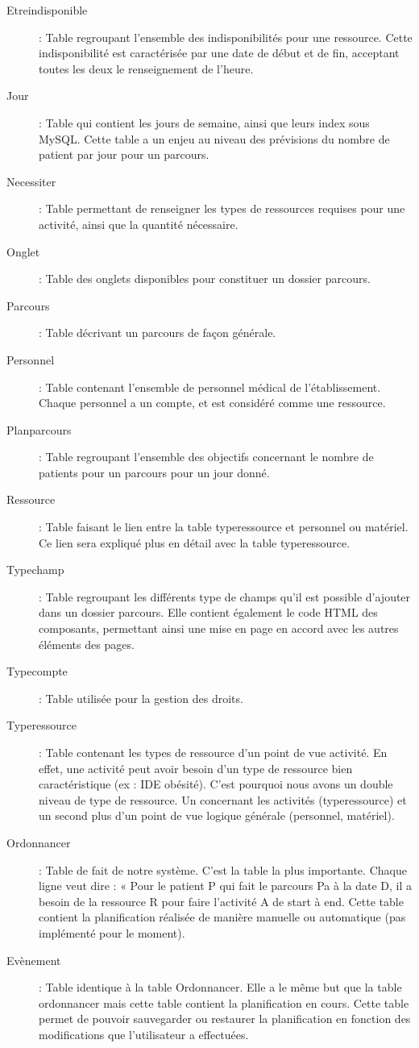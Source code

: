 \documentclass{polytech/polytech}
\begin{document}
\begin{description}
	\item[Etreindisponible] : Table regroupant l'ensemble des indisponibilités pour une ressource. Cette indisponibilité est caractérisée par une date de début et de fin, acceptant toutes les deux le renseignement de l'heure.
	\item[Jour] : Table qui contient les jours de semaine, ainsi que leurs index sous MySQL. Cette table a un enjeu au niveau des prévisions du nombre de patient par jour pour un parcours.
	\item[Necessiter] : Table permettant de renseigner les types de ressources requises pour une activité, ainsi que la quantité nécessaire.
	\item[Onglet] : Table des onglets disponibles pour constituer un dossier parcours.
	\item[Parcours]	 : Table décrivant un parcours de façon générale.
	\item[Personnel] : Table contenant l'ensemble de personnel médical de l'établissement. Chaque personnel a un compte, et est considéré comme une ressource.
	\item[Planparcours] : Table regroupant l'ensemble des objectifs concernant le nombre de patients pour un parcours pour un jour donné.
	\item[Ressource] : Table faisant le lien entre la table typeressource et personnel ou matériel. Ce lien	sera expliqué plus en détail avec la table typeressource.
	\item[Typechamp] : Table regroupant les différents type de champs qu'il est possible d'ajouter dans un dossier parcours. Elle contient également le code HTML des composants, permettant ainsi une	mise en page en accord avec les autres éléments des pages.
	\item[Typecompte] : Table utilisée pour la gestion des droits.
	\item[Typeressource] : Table contenant les types de ressource d'un point de vue activité. En effet, une activité peut avoir besoin d'un type de ressource bien caractéristique (ex : IDE obésité). C'est pourquoi nous avons un double niveau de type de ressource. Un concernant les activités (typeressource) et un second plus d’un point de vue logique générale (personnel, matériel).
	\item[Ordonnancer] : Table de fait de notre système. C'est la table la plus importante. Chaque ligne veut dire : « Pour le patient P qui fait le parcours Pa à la date D, il a besoin de la ressource R pour faire l’activité A de start à end. Cette table contient la planification réalisée de manière manuelle ou automatique (pas implémenté pour le moment).
	\item[Evènement] : Table identique à la table Ordonnancer. Elle a le même but que la table ordonnancer mais cette table contient la planification en cours. Cette table permet de pouvoir sauvegarder ou restaurer la planification en fonction des modifications que l’utilisateur a effectuées.
\end{description}
\end{document}
